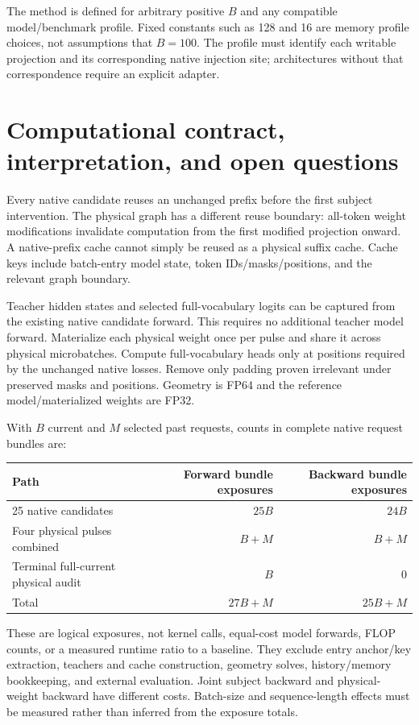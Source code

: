 \documentclass[10pt]{article}
\begin{document}
The method is defined for arbitrary positive $B$ and any compatible
model/benchmark profile. Fixed constants such as 128 and 16 are memory
profile choices, not assumptions that $B=100$. The profile must identify
each writable projection and its corresponding native injection site;
architectures without that correspondence require an explicit adapter.

\newpage
\section{Computational contract, interpretation, and open questions}
Every native candidate reuses an unchanged prefix before the first
subject intervention. The physical graph has a different reuse boundary:
all-token weight modifications invalidate computation from the first
modified projection onward. A native-prefix cache cannot simply be
reused as a physical suffix cache. Cache keys include batch-entry model
state, token IDs/masks/positions, and the relevant graph boundary.

Teacher hidden states and selected full-vocabulary logits can be captured
from the existing native candidate forward. This requires no additional
teacher model forward. Materialize each physical weight once per pulse
and share it across physical microbatches. Compute full-vocabulary heads
only at positions required by the unchanged native losses. Remove only
padding proven irrelevant under preserved masks and positions. Geometry
is FP64 and the reference model/materialized weights are FP32.

With $B$ current and $M$ selected past requests, counts in complete native
request bundles are:
\begin{center}
\begin{tabular}{lrr}
\toprule
Path & Forward bundle exposures & Backward bundle exposures\\
\midrule
25 native candidates & $25B$ & $24B$\\
Four physical pulses combined & $B+M$ & $B+M$\\
Terminal full-current physical audit & $B$ & $0$\\
\midrule
Total & $27B+M$ & $25B+M$\\
\bottomrule
\end{tabular}
\end{center}
These are logical exposures, not kernel calls, equal-cost model forwards,
FLOP counts, or a measured runtime ratio to a baseline. They exclude entry
anchor/key extraction, teachers and cache construction, geometry solves,
history/memory bookkeeping, and external evaluation. Joint subject
backward and physical-weight backward have different costs. Batch-size
and sequence-length effects must be measured rather than inferred from
the exposure totals.
\end{document}
